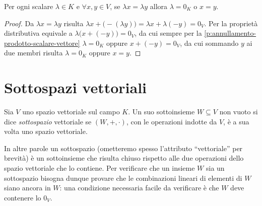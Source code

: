 \begin{proprieta} \label{p:cancellazione-scalare}
	Per ogni scalare $\lambda\in K$ e $\forall x,y\in V$, se $\lambda x=\lambda y$ allora $\lambda=0_K$ o $x=y$.
\end{proprieta}
\begin{proof}
	Da $\lambda x=\lambda y$ risulta $\lambda x+\big(-(\lambda y)\big)=\lambda x+\lambda(-y)=0_V$.
	Per la proprietà distributiva equivale a $\lambda\big(x+(-y)\big)=0_V$, da cui sempre per la \ref{p:annullamento-prodotto-scalare-vettore} $\lambda=0_K$ oppure $  x+(-y)=0_V$, da cui sommando $y$ ai due membri risulta $\lambda=0_K$ oppure $x=y$.
\end{proof}

\section{Sottospazi vettoriali} \label{ref:sottospazi-vettoriali}
\begin{definizione} \label{d:sottospazio-vettoriale}
	Sia $V$ uno spazio vettoriale sul campo $K$.
	Un suo sottoinsieme $W\subseteq V$ non vuoto si dice \emph{sottospazio} vettoriale se $(W,+,\cdot)$, con le operazioni indotte da $V$, è a sua volta uno spazio vettoriale.
\end{definizione}
In altre parole un sottospazio (ometteremo spesso l'attributo ``vettoriale'' per brevità) è un sottoinsieme che risulta chiuso rispetto alle due operazioni dello spazio vettoriale che lo contiene.
Per verificare che un insieme $W$ sia un sottospazio bisogna dunque provare che le combinazioni lineari di elementi di $W$ siano ancora in $W$: una condizione necessaria facile da verificare è che $W$ deve contenere lo $0_V$.

